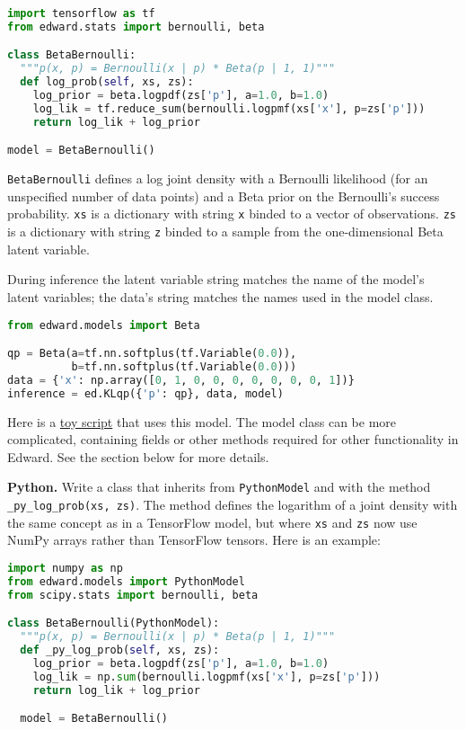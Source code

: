 \begin{lstlisting}[language=Python]
import tensorflow as tf
from edward.stats import bernoulli, beta

class BetaBernoulli:
  """p(x, p) = Bernoulli(x | p) * Beta(p | 1, 1)"""
  def log_prob(self, xs, zs):
    log_prior = beta.logpdf(zs['p'], a=1.0, b=1.0)
    log_lik = tf.reduce_sum(bernoulli.logpmf(xs['x'], p=zs['p']))
    return log_lik + log_prior

model = BetaBernoulli()
\end{lstlisting}

\texttt{BetaBernoulli} defines a log joint density with a Bernoulli
likelihood (for an unspecified number of data points) and a Beta prior
on the Bernoulli's success probability.
\texttt{xs} is a dictionary with string \texttt{x} binded to a vector of
observations. \texttt{zs} is a dictionary with string \texttt{z} binded to a
sample from the one-dimensional Beta latent variable.

During inference the latent variable string matches the name of the
model's latent variables; the data's string matches the names used in
the model class.

\begin{lstlisting}[language=Python]
from edward.models import Beta

qp = Beta(a=tf.nn.softplus(tf.Variable(0.0)),
          b=tf.nn.softplus(tf.Variable(0.0)))
data = {'x': np.array([0, 1, 0, 0, 0, 0, 0, 0, 0, 1])}
inference = ed.KLqp({'p': qp}, data, model)
\end{lstlisting}

Here is a
\href{https://github.com/blei-lab/edward/blob/master/examples/tf_beta_bernoulli.py}
{toy script}
that uses this model. The model class can be more complicated,
containing fields or other methods required for other functionality in
Edward. See the section below for more details.

\textbf{Python.}
Write a class that inherits from \texttt{PythonModel} and with the method
\texttt{_py_log_prob(xs, zs)}. The method defines the logarithm of a joint
density with the same concept as in a TensorFlow model, but where
\texttt{xs} and \texttt{zs} now use NumPy arrays rather than TensorFlow tensors.
Here is an example:

\begin{lstlisting}[language=Python]
import numpy as np
from edward.models import PythonModel
from scipy.stats import bernoulli, beta

class BetaBernoulli(PythonModel):
  """p(x, p) = Bernoulli(x | p) * Beta(p | 1, 1)"""
  def _py_log_prob(self, xs, zs):
    log_prior = beta.logpdf(zs['p'], a=1.0, b=1.0)
    log_lik = np.sum(bernoulli.logpmf(xs['x'], p=zs['p']))
    return log_lik + log_prior

  model = BetaBernoulli()
\end{lstlisting}

